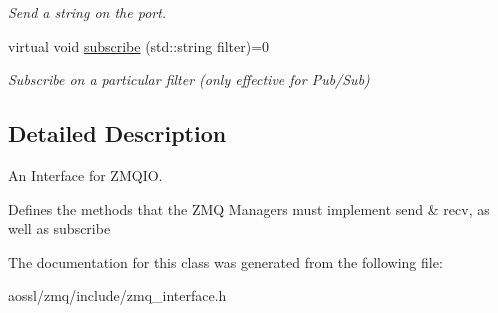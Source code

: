 \begin{DoxyCompactItemize}
\begin{DoxyCompactList}\small\item\em Send a string on the port. \end{DoxyCompactList}\item 
virtual void \hyperlink{classZmqio_aa315934401c5a3ba2eb502c16a3a6aca}{subscribe} (std\+::string filter)=0\hypertarget{classZmqio_aa315934401c5a3ba2eb502c16a3a6aca}{}\label{classZmqio_aa315934401c5a3ba2eb502c16a3a6aca}

\begin{DoxyCompactList}\small\item\em Subscribe on a particular filter (only effective for Pub/\+Sub) \end{DoxyCompactList}\end{DoxyCompactItemize}


\subsection{Detailed Description}
An Interface for Z\+M\+Q\+IO. 

Defines the methods that the Z\+MQ Managers must implement send \& recv, as well as subscribe 

The documentation for this class was generated from the following file\+:\begin{DoxyCompactItemize}
\item 
aossl/zmq/include/zmq\+\_\+interface.\+h\end{DoxyCompactItemize}
